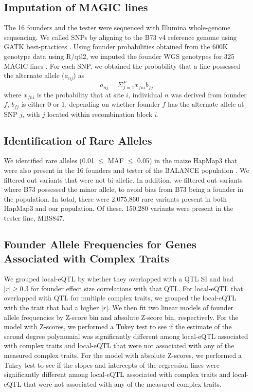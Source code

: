 \documentclass[article,9pt,twocolumn,twoside]{rilabRxiv}
\begin{document}
\subsection{Imputation of MAGIC lines}
The 16 founders and the tester were sequenced with Illumina whole-genome sequencing.
We called SNPs by aligning to the B73 v4 reference genome using GATK best-practices \citep{VanDerAuwera}.
Using founder probabilities obtained from the 600K genotype data using R/qtl2, we imputed the founder WGS genotypes for 325 MAGIC lines \citep{Broman}.
For each SNP, we obtained the probability that a line possessed the alternate allele ($a_{nj}$) as
    \begin{equation}
    \label{eqn:allele_prob}
      a_{nj} = \Sigma_{f=1}^F x_{fni}b_{fj}
    \end{equation}
where $x_{fni}$ is the probability that at site $i$, individual $n$ was derived from founder $f$, $b_{fj}$ is either 0 or 1, depending on whether founder $f$ has the alternate allele at SNP $j$, with $j$ located within recombination block $i$.

\subsection{Identification of Rare Alleles}
We identified rare alleles (0.01 $\le$ MAF $\le$ 0.05) in the maize HapMap3 that were also present in the 16 founders and tester of the BALANCE population \citep{Bukowski}.
We filtered out variants that were not bi-allelic.
In addition, we filtered out variants where B73 possessed the minor allele, to avoid bias from B73 being a founder in the population.
In total, there were 2,075,860 rare variants present in both HapMap3 and our population.
Of these, 150,280 variants were present in the tester line, MBS847.

\subsection{Founder Allele Frequencies for Genes Associated with Complex Traits}
We grouped local-eQTL by whether they overlapped with a QTL SI and had $|r| \ge 0.3$ for founder effect size correlations with that QTL.
For local-eQTL that overlapped with QTL for multiple complex traits, we grouped the local-eQTL with the trait that had a higher $|r|$.
We then fit two linear models of founder allele frequencies by Z-score bin and absolute Z-score bin, respectively.
For the model with Z-scores, we performed a Tukey test to see if the estimate of the second degree polynomial was significantly different among local-eQTL associated with complex traits and local-eQTL that were not associated with any of the measured complex traits.
For the model with absolute Z-scores, we performed a Tukey test to see if the slopes and intercepts of the regression lines were significantly different among local-eQTL associated with complex traits and local-eQTL that were not associated with any of the measured complex traits. 
\end{document}
